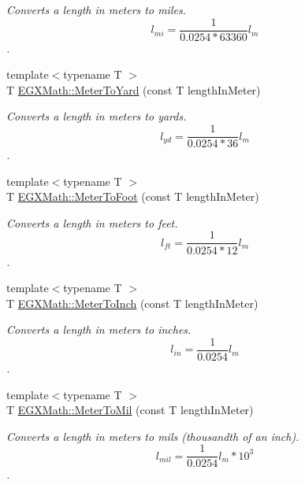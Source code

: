 \begin{DoxyCompactItemize}
\begin{DoxyCompactList}\small\item\em Converts a length in meters to miles. \[ l_{mi}=\frac{1}{0.0254 * 63360} l_{m} \]. \end{DoxyCompactList}\item 
{\footnotesize template$<$typename T $>$ }\\T \mbox{\hyperlink{group___e_g_x_math-_conversions-_length_conversions-_s_i-_meter-_imperial_ga958e4dfc661ba34f49bc3aaebe6e30be}{E\+G\+X\+Math\+::\+Meter\+To\+Yard}} (const T length\+In\+Meter)
\begin{DoxyCompactList}\small\item\em Converts a length in meters to yards. \[ l_{yd}= \frac{1}{0.0254 * 36} l_{m} \]. \end{DoxyCompactList}\item 
{\footnotesize template$<$typename T $>$ }\\T \mbox{\hyperlink{group___e_g_x_math-_conversions-_length_conversions-_s_i-_meter-_imperial_gad5d3d7875ebe02e1a988665271360f34}{E\+G\+X\+Math\+::\+Meter\+To\+Foot}} (const T length\+In\+Meter)
\begin{DoxyCompactList}\small\item\em Converts a length in meters to feet. \[ l_{ft}= \frac{1}{0.0254 * 12} l_{m} \]. \end{DoxyCompactList}\item 
{\footnotesize template$<$typename T $>$ }\\T \mbox{\hyperlink{group___e_g_x_math-_conversions-_length_conversions-_s_i-_meter-_imperial_gaaf056673bfe97e10a61a527f4b3598ba}{E\+G\+X\+Math\+::\+Meter\+To\+Inch}} (const T length\+In\+Meter)
\begin{DoxyCompactList}\small\item\em Converts a length in meters to inches. \[ l_{in}=\frac{1}{0.0254} l_{m} \]. \end{DoxyCompactList}\item 
{\footnotesize template$<$typename T $>$ }\\T \mbox{\hyperlink{group___e_g_x_math-_conversions-_length_conversions-_s_i-_meter-_imperial_ga6a58893d0f7e17e425c7bd0b3235320d}{E\+G\+X\+Math\+::\+Meter\+To\+Mil}} (const T length\+In\+Meter)
\begin{DoxyCompactList}\small\item\em Converts a length in meters to mils (thousandth of an inch). \[ l_{mil}= \frac{1}{0.0254} l_{m} * 10^{3} \]. \end{DoxyCompactList}\item 

\end{DoxyCompactItemize}
